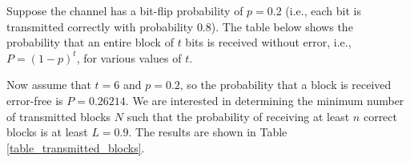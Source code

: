 \documentclass[a4paper,11pt]{llncs}
\begin{document}
\begin{example}
Suppose the channel has a bit-flip probability of $p = 0.2$ (i.e., each bit is transmitted correctly with probability $0.8$). The table below shows the probability that an entire block of $t$ bits is received without error, i.e., $P = (1 - p)^t$, for various values of $t$.

    \begin{table}[h!]
    \centering
    \vspace{3mm}
    \caption{Probability of a $t$-bit block being received without error over BSC$(p)$}
    \end{table}
    
    Now assume that $t = 6$ and $p = 0.2$, so the probability that a block is received error-free is $P = 0.26214$. We are interested in determining the minimum number of transmitted blocks $N$ such that the probability of receiving at least $n$ correct blocks is at least $L = 0.9$. The results are shown in Table \ref{table_transmitted_blocks}.
    
    \begin{table}[h!]
    \centering
    \vspace{3mm}
    \caption{Minimum number of transmitted blocks needed to achieve 90\% confidence of receiving at least $n$ correct blocks with $t = 6$, $p = 0.2$}
    \end{table}
\end{example}
\end{document}
